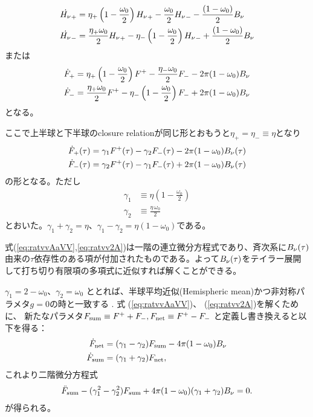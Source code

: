 \begin{align}
\label{eq:ratvvA}
\dot{{H_\nu}}_+ &= \eta_+ \left( 1 - \frac{\omega_0}{2}\right) {H_\nu}_+ - \frac{ \omega_0}{2}  {H_\nu}_- - \frac{(1-\omega_0)}{2} B_\nu  \\
 \label{eq:ratvv2A}
 \dot{{H_\nu}}_- &= \frac{\eta_+ \omega_0}{2} {H_\nu}_+ -  \eta_- \left( 1 - \frac{ \omega_0}{2}\right) {H_\nu}_- + \frac{(1-\omega_0)}{2} B_\nu
 \end{align}
または
\begin{align}
\label{eq:ratvvA}
\dot{F}_+ &= \eta_+ \left( 1 - \frac{\omega_0}{2}\right) F^+ -  \frac{\eta_- \omega_0}{2}  F_- - 2 \pi (1-\omega_0) B_\nu  \\
 \label{eq:ratvv2A}
 \dot{F}_- &= \frac{\eta_+ \omega_0}{2} F^+ -  \eta_- \left( 1 - \frac{ \omega_0}{2}\right) F_- + 2 \pi (1-\omega_0) B_\nu
 \end{align}
となる。

ここで上半球と下半球のclosure relationが同じ形とおもうと$\eta_+ = \eta_- \equiv \eta$となり
\begin{align}
\label{eq:ratvvAaVV}
\dot{F}_+ (\tau) &= \gamma_1 F^+ (\tau) - \gamma_2  F_- (\tau) - 2 \pi (1-\omega_0) B_\nu  (\tau) \\
 \label{eq:ratvv2A}
 \dot{F}_- (\tau) &=  \gamma_2 F^+ (\tau) - \gamma_1 F_- (\tau) + 2 \pi (1-\omega_0) B_\nu (\tau)
 \end{align}
の形となる。ただし
\begin{align}
\gamma_1 &\equiv\eta \left( 1 - \frac{\omega_0}{2}\right) \\
\gamma_2 &\equiv\frac{\eta \, \omega_0}{2}
\end{align}
とおいた。$\gamma_1+\gamma_2=\eta$、$\gamma_1-\gamma_2=\eta (1-\omega_0)$である。

式(\ref{eq:ratvvAaVV},\ref{eq:ratvv2A})は一階の連立微分方程式であり、斉次系に$B_\nu(\tau)$由来の$\tau$依存性のある項が付加されたものである。よって$B_\nu(\tau)$をテイラー展開して打ち切り有限項の多項式に近似すれば解くことができる。


$\gamma_1 = 2 - \omega_0$、$\gamma_2 = \omega_0$ ととれば、半球平均近似(Hemispheric mean)かつ非対称パラメタ$g=0$の時と一致する \cite{1989JGR....9416287T}. 式 (\ref{eq:ratvvAaVV})、  (\ref{eq:ratvv2A})を解くために、 新たなパラメタ$F_\mathrm{sum} \equiv F^+ + F_-, F_\mathrm{net} \equiv F^+ - F_-$ と定義し書き換えると以下を得る：
\begin{align}
\dot{F}_\mathrm{net} &= (\gamma_1 - \gamma_2) F_\mathrm{sum} - 4 \pi (1- \omega_0) B_\nu\\
\dot{F}_\mathrm{sum} &=  (\gamma_1 + \gamma_2)  F_\mathrm{net},
\end{align}
これより二階微分方程式
\begin{align}
\ddot{F}_\mathrm{sum} - (\gamma_1^2 - \gamma_2^2)  F_\mathrm{sum} + 4 \pi (1-\omega_0) (\gamma_1 + \gamma_2) B_\nu = 0.
\end{align}
が得られる。

